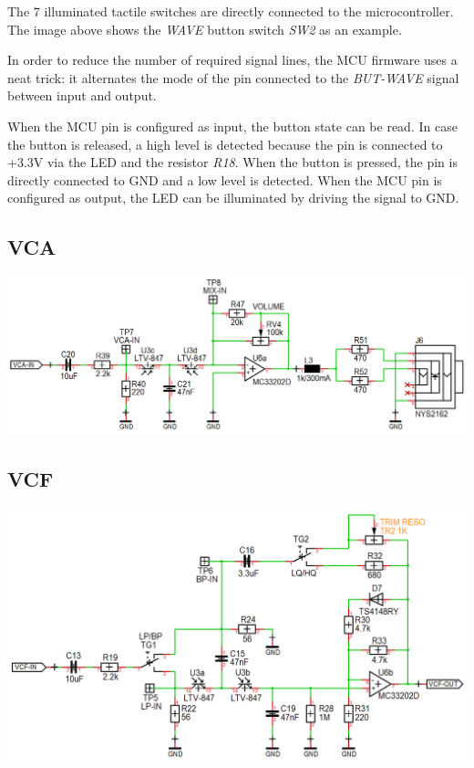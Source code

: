 \documentclass{scrartcl}
\begin{document}
The 7 illuminated tactile switches are directly connected to the microcontroller. The image above shows the \emph{WAVE} button switch \emph{SW2} as an example.

In order to reduce the number of required signal lines, the MCU firmware uses a neat trick: it alternates the mode of the pin connected to the \emph{BUT-WAVE} signal between input and output.

When the MCU pin is configured as input, the button state can be read. In case the button is released, a high level is detected because the pin is connected to +3.3V via the LED and the resistor \emph{R18}. When the button is pressed, the pin is directly connected to GND and a low level is detected. When the MCU pin is configured as output, the LED can be illuminated by driving the signal to GND.

\subsection{VCA}

\begin{center}
    \includegraphics[scale=0.37]{assets/schema-vca.png}
\end{center}

\subsection{VCF}

\begin{center}
    \includegraphics[scale=0.39]{assets/schema-vcf.png}
\end{center}
\end{document}
